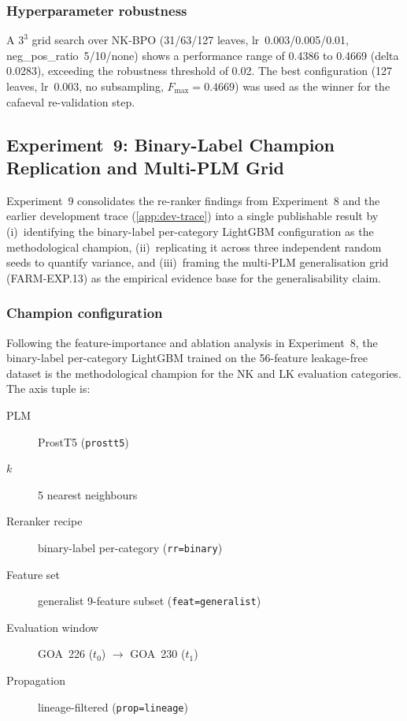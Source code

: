 \subsubsection{Hyperparameter robustness}

A $3^3$ grid search over NK-BPO (31/63/127 leaves, lr~0.003/0.005/0.01,
neg\_pos\_ratio~5/10/none) shows a performance range of 0.4386 to 0.4669
(delta 0.0283), exceeding the robustness threshold of 0.02. The best
configuration (127 leaves, lr~0.003, no subsampling, $F_{\max} = 0.4669$) was
used as the winner for the cafaeval re-validation step.

\subsection{Experiment~9: Binary-Label Champion Replication and Multi-PLM Grid}
\label{subsec:exp9-champion}

Experiment~9 consolidates the re-ranker findings from Experiment~8 and the
earlier development trace (\cref{app:dev-trace}) into a single publishable
result by (i)~identifying the binary-label per-category
LightGBM configuration as the methodological champion, (ii)~replicating it
across three independent random seeds to quantify variance, and
(iii)~framing the multi-PLM generalisation grid (FARM-EXP.13) as the empirical
evidence base for the generalisability claim.

\subsubsection{Champion configuration}

Following the feature-importance and ablation analysis in Experiment~8, the
binary-label per-category LightGBM trained on the 56-feature leakage-free
dataset is the methodological champion for the NK and LK evaluation categories.
The axis tuple is:

\begin{description}
  \item[PLM] ProstT5 (\texttt{prostt5})
  \item[$k$] 5 nearest neighbours
  \item[Reranker recipe] binary-label per-category (\texttt{rr=binary})
  \item[Feature set] generalist 9-feature subset (\texttt{feat=generalist})
  \item[Evaluation window] GOA~226 ($t_0$) $\to$ GOA~230 ($t_1$)
  \item[Propagation] lineage-filtered (\texttt{prop=lineage})
\end{description}


